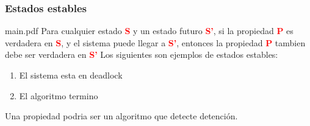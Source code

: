 \subsubsection{Estados estables}
main.pdf
Para cualquier estado \textcolor{red}{\textbf{S}} y un estado futuro \textcolor{red}{\textbf{S'}}, si la propiedad \textcolor{red}{\textbf{P}} es verdadera en \textcolor{red}{\textbf{S}}, y el sistema puede llegar a \textcolor{red}{\textbf{S'}}, entonces la propiedad \textcolor{red}{\textbf{P}} tambien debe ser verdadera en \textcolor{red}{\textbf{S'}}
Los siguientes son ejemplos de estados estables:
\begin{enumerate}
  \item El sistema esta en deadlock
  \item El algoritmo termino
\end{enumerate}
Una propiedad podria ser un algoritmo que detecte detención.